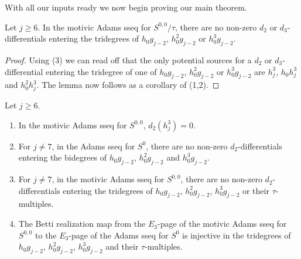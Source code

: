 With all our inputs ready we now begin proving our main theorem.

\begin{lem} \label{lem:ctau-entering-diffls}
  Let $j \geq 6$.
  In the motivic Adams sseq for $S^{0,0}/\tau$, 
  there are no non-zero $d_2$ or $d_3$-differentials entering the tridegrees of
  $h_0g_{j-2}$, $h_0^2g_{j-2}$ or $h_0^3 g_{j-2}$.
\end{lem}

\begin{proof}
  Using (3) we can read off that the only potential sources for a $d_2$ or $d_3$-differential entering the tridegree of one of $h_0g_{j-2}$, $h_0^2g_{j-2}$ or $h_0^3 g_{j-2}$ are
  $h_j^3$, $h_0h_j^3$ and $h_0^2h_j^3$.
  The lemma now follows as a corollary of (1,2).
\end{proof}



\begin{lem} \label{lem:d2 diffls}
  Let $j \geq 6$.
  \begin{enumerate}
  \item In the motivic Adams sseq for $S^{0,0}$, $d_2(h_j^3) = 0$.
  \item For $j \neq 7$, in the Adams sseq for $S^0$, there are no non-zero $d_2$-differentials entering the bidegrees of $h_0g_{j-2}$, $h_0^2 g_{j-2}$ and $h_0^3 g_{j-2}$.
  \item For $j \neq 7$, in the motivic Adams sseq for $S^{0,0}$, there are no non-zero $d_2$-differentials entering the tridegrees of $h_0g_{j-2}$, $h_0^2 g_{j-2}$, $h_0^3 g_{j-2}$ or their $\tau$-multiples.
  \item The Betti realization map from
    the $E_3$-page of the motivic Adams sseq for $S^{0,0}$ to
    the $E_3$-page of the Adams sseq for $S^{0}$ is
    injective in the tridegrees of $h_0g_{j-2}$, $h_0^2 g_{j-2}$, $h_0^3 g_{j-2}$ and their $\tau$-multiples.
  \end{enumerate}  
\end{lem}

